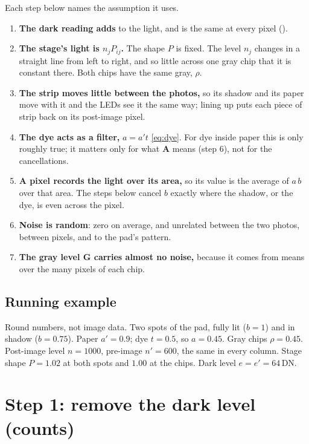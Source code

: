 \documentclass[11pt,letter]{article}
\newcommand{\file}[1]{\texttt{\seqsplit{#1}}}
\newcommand{\iG}{\mathbf{G}}   %
\newcommand{\iA}{\mathbf{A}}   %
\begin{document}
Each step below names the assumption it uses.
\begin{enumerate}[label=(A\arabic*), leftmargin=3.2em]
  \item \textbf{The dark reading adds} to the light, and is the same at
    every pixel (\file{dark\_signal\_characterization.tex}).
  \item \textbf{The stage's light is $n_j P_{ij}$.}  The shape $P$ is
    fixed.  The level $n_j$ changes in a straight line from left to right,
    and so little across one gray chip that it is constant there.  Both
    chips have the same gray, $\rho$.
  \item \textbf{The strip moves little between the photos,} so its shadow
    and its paper move with it and the LEDs see it the same way; lining up
    puts each piece of strip back on its post-image pixel.
  \item \textbf{The dye acts as a filter,} $a = a' t$
    \eqref{eq:dye}.  For dye inside paper this is only roughly true; it
    matters only for what $\iA$ means (step 6), not for the cancellations.
  \item \textbf{A pixel records the light over its area,} so its value is
    the average of $a\,b$ over that area.  The steps below cancel $b$
    exactly where the shadow, or the dye, is even across the pixel.
  \item \textbf{Noise is random}: zero on average, and unrelated between
    the two photos, between pixels, and to the pad's pattern.
  \item \textbf{The gray level $\iG$ carries almost no noise,} because it
    comes from means over the many pixels of each chip.
\end{enumerate}

\subsection*{Running example}

Round numbers, not image data.  Two spots of the pad, fully lit
($b = 1$) and in shadow ($b = 0.75$).  Paper $a' = 0.9$; dye $t = 0.5$, so
$a = 0.45$.  Gray chips $\rho = 0.45$.  Post-image level $n = 1000$,
pre-image $n' = 600$, the same in every column.  Stage shape $P = 1.02$ at
both spots and $1.00$ at the chips.  Dark level $e = e' = 64$\,DN.

\section{Step 1: remove the dark level (counts)}
\label{sec:dark}
\end{document}

